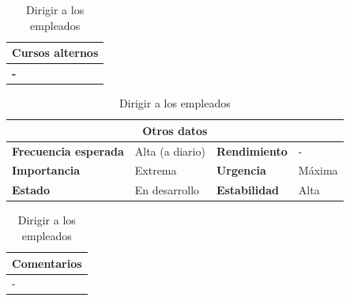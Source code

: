 \documentclass[12pt,spanish]{article}
\begin{document}
\begin{table}[H]
\vspace{1cm}

\begin{tabular}{|m{10pt}|m{7.15cm}|m{10pt}|m{7.15cm}|}
\hline
\multicolumn{4}{|m{16.2cm}|}{\textbf{Cursos alternos}} \\
\hline
\multicolumn{4}{|m{16.2cm}|}{\textbf{-}} \\
\hline
\end{tabular}

\vspace{1cm}

\begin{tabular}{|m{3.72cm}|m{3.72cm}|m{3.72cm}|m{3.72cm}|}
\hline
\multicolumn{4}{|c|}{\textbf{Otros datos}} \\
\hline
\textbf{Frecuencia esperada} & Alta (a diario) & \textbf{Rendimiento} & - \\
\hline
\textbf{Importancia} & Extrema & \textbf{Urgencia} & Máxima \\
\hline
\textbf{Estado} & En desarrollo & \textbf{Estabilidad} & Alta \\
\hline
\end{tabular}

\vspace{1cm}

\begin{tabular}{|m{16.2cm}|}
\hline
\textbf{Comentarios} \\
\hline
- \\
\hline
\end{tabular}

\caption{Dirigir a los empleados}

\end{table}

\end{document}
